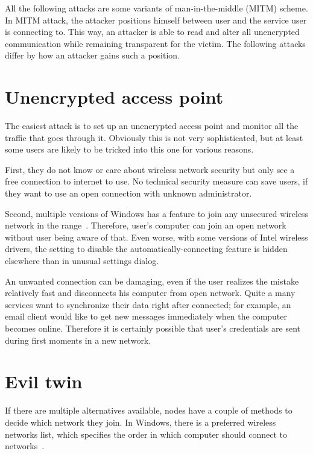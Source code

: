 \documentclass[12pt,a4paper,oneside,pdftex]{report}
\begin{document}
All the following attacks are some variants of man-in-the-middle (MITM) scheme. In MITM attack, the attacker positions himself between user and the service user is connecting to. This way, an attacker is able to read and alter all unencrypted communication while remaining transparent for the victim. The following attacks differ by how an attacker gains such a position.

\section{Unencrypted access point}
\label{sec:attack_unencrypted}

The easiest attack is to set up an unencrypted access point and monitor all the traffic that goes through it. Obviously this is not very sophisticated, but at least some users are likely to be tricked into this one for various reasons.

First, they do not know or care about wireless network security but only see a free connection to internet to use. No technical security measure can save users, if they want to use an open connection with unknown administrator.

Second, multiple versions of Windows has a feature to join any unsecured wireless network in the range~\cite{dai2005attacking,windows_wifi_answers}. Therefore, user's computer can join an open network without user being aware of that. Even worse, with some versions of Intel wireless drivers, the setting to disable the automatically-connecting feature is hidden elsewhere than in unusual settings dialog.~\cite{windows_wifi_answers}

An unwanted connection can be damaging, even if the user realizes the mistake relatively fast and disconnects his computer from open network. Quite a many services want to synchronize their data right after connected; for example, an email client would like to get new messages immediately when the computer becomes online. Therefore it is certainly possible that user's credentials are sent during first moments in a new network.

\section{Evil twin}
\label{sec:evil_twin}

If there are multiple alternatives available, nodes have a couple of methods to decide which network they join. In Windows, there is a preferred wireless networks list, which specifies the order in which computer should connect to networks~\cite{windows_wifi_preferred}. 
\end{document}
